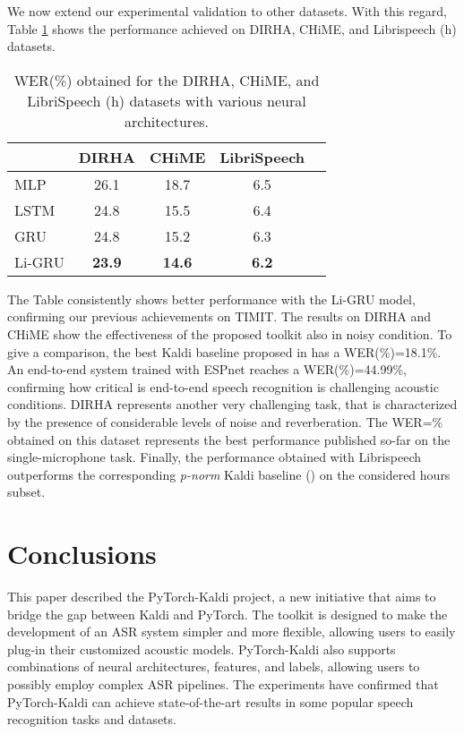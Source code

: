 \documentclass{article}
\begin{document}
We now extend our experimental validation to other datasets. 
With this regard, Table \ref{tab:res5} shows the performance achieved on DIRHA, CHiME, and Librispeech (h) datasets.
\begin{table}[t!]
\caption{WER(\%) obtained for the DIRHA, CHiME, and LibriSpeech (h) datasets with various neural architectures.}
\centering

\begin{tabular}{l|cccc}  
& DIRHA &  CHiME & LibriSpeech \\ \hline
MLP & 26.1  & 18.7  & 6.5  \\ 
LSTM & 24.8  & 15.5 & 6.4    \\ 
GRU & 24.8  & 15.2 & 6.3   \\ 
Li-GRU & \textbf{23.9} & \textbf{14.6} & \textbf{6.2} \\
\bottomrule
\end{tabular}
\label{tab:res5}
\end{table}
The Table consistently shows better performance with the Li-GRU model, confirming our previous achievements on TIMIT. The results on DIRHA and CHiME show the effectiveness of the proposed toolkit also in noisy condition. To give a comparison, the best Kaldi baseline proposed in  has a WER(\%)=18.1\%. An end-to-end system trained with ESPnet reaches a WER(\%)=44.99\%, confirming how critical is end-to-end speech recognition is challenging acoustic conditions. 
DIRHA represents another very challenging task, that is characterized by the presence of considerable levels of noise and reverberation.  The WER=\% obtained on this dataset represents the best performance published so-far on the single-microphone task. Finally, the performance obtained with Librispeech outperforms the corresponding \textit{p-norm} Kaldi baseline () on the considered  hours subset.

\section{Conclusions}
This paper described the PyTorch-Kaldi project, a new initiative that aims to bridge the gap between Kaldi and PyTorch. The toolkit is designed to make the development of an ASR system simpler and more flexible, allowing users to easily plug-in their customized acoustic models. PyTorch-Kaldi also supports combinations of neural architectures, features, and labels, allowing users to possibly employ complex ASR pipelines. The experiments have confirmed that PyTorch-Kaldi can achieve state-of-the-art results in some popular speech recognition tasks and datasets.
\end{document}
